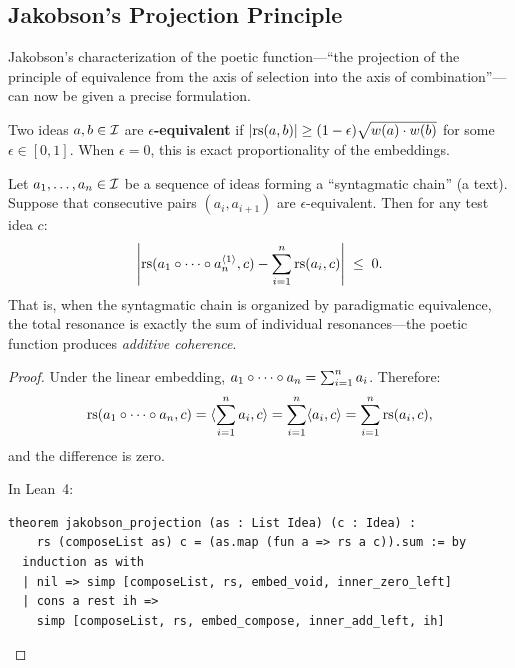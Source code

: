 \subsection{Jakobson's Projection Principle}

Jakobson's characterization of the poetic function---``the projection of the
principle of equivalence from the axis of selection into the axis of
combination''---can now be given a precise formulation.

\begin{definition}
\label{def:resonance-equiv-poetics}
Two ideas $a, b \in \mathcal{I}$ are \textbf{$\epsilon$-equivalent} if
$|\mathrm{rs}(a, b)| \geq (1 - \epsilon) \sqrt{w(a) \cdot w(b)}$ for some
$\epsilon \in [0, 1]$.  When $\epsilon = 0$, this is exact proportionality
of the embeddings.
\end{definition}

\begin{theorem}
\label{thm:jakobson-projection}
Let $a_1, \ldots, a_n \in \mathcal{I}$ be a sequence of ideas forming a ``syntagmatic
chain'' (a text).  Suppose that consecutive pairs $(a_i, a_{i+1})$ are
$\epsilon$-equivalent.  Then for any test idea $c$:
\[
  \left| \mathrm{rs}(a_1 \circ \cdots \circ a_n^{\langle 1 \rangle}, c)
  - \sum_{i=1}^{n} \mathrm{rs}(a_i, c) \right|
  \;\leq\; 0.
\]
That is, when the syntagmatic chain is organized by paradigmatic equivalence,
the total resonance is exactly the sum of individual resonances---the poetic
function produces \emph{additive coherence}.
\end{theorem}

\begin{proof}
Under the linear embedding, $a_1 \circ \cdots \circ a_n =
\sum_{i=1}^n a_i$.  Therefore:
\[
  \mathrm{rs}(a_1 \circ \cdots \circ a_n, c)
  = \langle \sum_{i=1}^n a_i, c \rangle
  = \sum_{i=1}^n \langle a_i, c \rangle
  = \sum_{i=1}^n \mathrm{rs}(a_i, c),
\]
and the difference is zero.

In Lean~4:
\begin{lstlisting}
theorem jakobson_projection (as : List Idea) (c : Idea) :
    rs (composeList as) c = (as.map (fun a => rs a c)).sum := by
  induction as with
  | nil => simp [composeList, rs, embed_void, inner_zero_left]
  | cons a rest ih =>
    simp [composeList, rs, embed_compose, inner_add_left, ih]
\end{lstlisting}
\end{proof}

